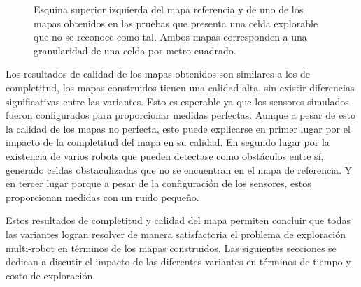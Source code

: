 \begin{figure}[H]
  \centerfloat

  \qquad

  \caption[Celda explorable que no se reconoce como tal.]{Esquina superior izquierda del mapa referencia y de uno de los mapas
  obtenidos en las pruebas que presenta una celda explorable que no se reconoce
como tal. Ambos mapas corresponden a una granularidad de una celda por metro cuadrado.}\label{fig:faltaCub}

\end{figure}

Los resultados de calidad de los mapas obtenidos son similares a los de
completitud, los mapas construidos tienen una calidad alta, sin existir
diferencias significativas entre las variantes. Esto es esperable ya que
los sensores simulados fueron configurados para proporcionar medidas perfectas.
Aunque a pesar de esto la calidad de los mapas no perfecta, esto puede explicarse en primer
lugar por el impacto de la completitud del mapa en su calidad. En segundo lugar
por la existencia de varios robots que pueden detectase como obstáculos entre
sí, generado celdas obstaculizadas que no se encuentran en el mapa de
referencia. Y en tercer lugar porque a pesar de la configuración de los
sensores, estos proporcionan medidas con un ruido pequeño.

Estos resultados de completitud y calidad del mapa permiten concluir que todas
las variantes logran resolver de manera satisfactoria el problema de
exploración multi-robot en términos de los mapas construidos. Las
siguientes secciones se dedican a discutir el impacto de las diferentes
variantes en términos de tiempo y costo de exploración.

